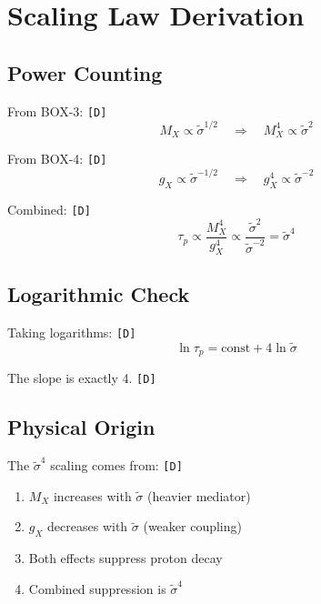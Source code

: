 \documentclass[11pt,a4paper]{article}
\newcommand{\tagD}{\textcolor{green!50!black}{\texttt{[D]}}}
\theoremstyle{definition}
\begin{document}
\section{Scaling Law Derivation}
\label{app:scaling}

\subsection{Power Counting}
\label{app:power-counting}

From BOX-3: \tagD{}
\begin{equation}
\label{eq:app-power-mx}
M_X \propto \tilde{\sigma}^{1/2} \quad \Rightarrow \quad M_X^4 \propto \tilde{\sigma}^2
\end{equation}

From BOX-4: \tagD{}
\begin{equation}
\label{eq:app-power-gx}
g_X \propto \tilde{\sigma}^{-1/2} \quad \Rightarrow \quad g_X^4 \propto \tilde{\sigma}^{-2}
\end{equation}

Combined: \tagD{}
\begin{equation}
\label{eq:app-power-tau}
\tau_p \propto \frac{M_X^4}{g_X^4} \propto \frac{\tilde{\sigma}^2}{\tilde{\sigma}^{-2}} = \tilde{\sigma}^4
\end{equation}

\subsection{Logarithmic Check}
\label{app:log-check}

Taking logarithms: \tagD{}
\begin{equation}
\label{eq:app-log-tau}
\ln\tau_p = \text{const} + 4\ln\tilde{\sigma}
\end{equation}

The slope is exactly 4. \tagD{}

\subsection{Physical Origin}
\label{app:physical-origin}

The $\tilde{\sigma}^4$ scaling comes from: \tagD{}
\begin{enumerate}
  \item $M_X$ increases with $\tilde{\sigma}$ (heavier mediator)
  \item $g_X$ decreases with $\tilde{\sigma}$ (weaker coupling)
  \item Both effects suppress proton decay
  \item Combined suppression is $\tilde{\sigma}^4$
\end{enumerate}
\end{document}
